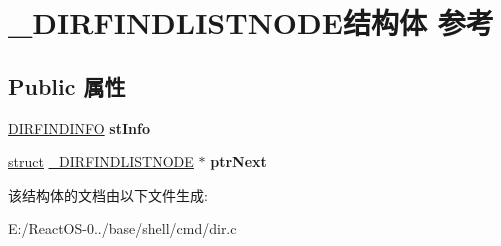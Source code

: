 \hypertarget{struct___d_i_r_f_i_n_d_l_i_s_t_n_o_d_e}{}\section{\+\_\+\+D\+I\+R\+F\+I\+N\+D\+L\+I\+S\+T\+N\+O\+D\+E结构体 参考}
\label{struct___d_i_r_f_i_n_d_l_i_s_t_n_o_d_e}
\subsection*{Public 属性}
\begin{DoxyCompactItemize}
\item 
\mbox{\label{struct___d_i_r_f_i_n_d_l_i_s_t_n_o_d_e_a66396195eecad2d51bc8b7c96fba33d9}} 
\hyperlink{struct___d_i_r_f_i_n_d_i_n_f_o}{D\+I\+R\+F\+I\+N\+D\+I\+N\+FO} {\bfseries st\+Info}
\item 
\mbox{\label{struct___d_i_r_f_i_n_d_l_i_s_t_n_o_d_e_ae054618afa41b5e843a936cba425d6da}} 
\hyperlink{interfacestruct}{struct} \hyperlink{struct___d_i_r_f_i_n_d_l_i_s_t_n_o_d_e}{\+\_\+\+D\+I\+R\+F\+I\+N\+D\+L\+I\+S\+T\+N\+O\+DE} $\ast$ {\bfseries ptr\+Next}
\end{DoxyCompactItemize}


该结构体的文档由以下文件生成\+:\begin{DoxyCompactItemize}
\item 
E\+:/\+React\+O\+S-\/0../base/shell/cmd/dir.\+c\end{DoxyCompactItemize}
